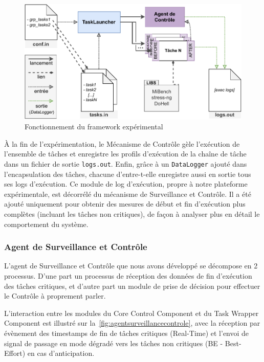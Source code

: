 \documentclass[french, a4paper, 11pt, twoside, pdftex]{StyleThese}
\begin{document}
    \begin{figure}[ht]
    	\centering
    	\includegraphics[width=\linewidth]{schemas/Implementation_Archi}
    	\caption{Fonctionnement du framework expérimental}
    	\label{fig:implementationarchi}
    \end{figure}

\pagebreak 
    À la fin de l'expérimentation, le Mécanisme de Contrôle gèle l'exécution de l'ensemble de tâches et enregistre les profils d'exécution de la chaîne de tâche dans un fichier de sortie \texttt{logs.out}.  Enfin, grâce à un \texttt{DataLogger} ajouté dans l'encapsulation des tâches, chacune d'entre-t-elle enregistre aussi en sortie tous ses logs d'exécution. Ce module de log d'exécution, propre à notre plateforme expérimentale, est décorrélé du mécanisme de Surveillance et Contrôle. Il a été ajouté uniquement pour obtenir des mesures de début et fin d'exécution plus complètes (incluant les tâches non critiques), de façon à analyser plus en détail le comportement du système.
        
    	\subsubsection{Agent de Surveillance et Contrôle}

	L'agent de Surveillance et Contrôle que nous avons développé se décompose en 2 processus. D'une part un processus de réception des données de fin d'exécution des tâches critiques, et d'autre part un module de prise de décision pour effectuer le Contrôle à proprement parler.
	
	L’interaction entre les modules du Core Control Component et du Task Wrapper Component est illustré sur la~\autoref{fig:agentsurveillancecontrole}, avec la réception par évènement des timestamps de fin de tâches critiques (Real-Time) et l'envoi de signal de passage en mode dégradé vers les tâches non critiques (BE - Best-Effort) en cas d'anticipation.
\end{document}
